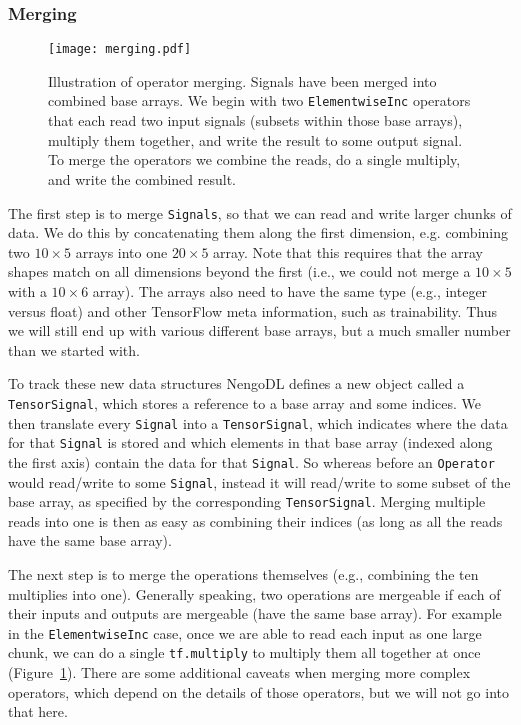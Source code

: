 \documentclass{article}
\begin{document}
\subsubsection{Merging}
\label{sec:merging}

\begin{figure}
\centering
\texttt{[image: merging.pdf]}
\caption{Illustration of operator merging.  Signals have been merged into combined base arrays.  We begin with two \texttt{ElementwiseInc} operators that each read two input signals (subsets within those base arrays), multiply them together, and write the result to some output signal.  To merge the operators we combine the reads, do a single multiply, and write the combined result.}
\label{fig:merging}
\end{figure}

The first step is to merge \texttt{Signals}, so that we can read and write larger chunks of data.  We do this by concatenating them along the first dimension, e.g. combining two $10 \times 5$ arrays into one $20 \times 5$ array.  Note that this requires that the array shapes match on all dimensions beyond the first (i.e., we could not merge a $10 \times 5$ with a $10 \times 6$ array).  The arrays also need to have the same type (e.g., integer versus float) and other TensorFlow meta information, such as trainability.  Thus we will still end up with various different base arrays, but a much smaller number than we started with.

To track these new data structures NengoDL defines a new object called a \texttt{TensorSignal}, which stores a reference to a base array and some indices.  We then translate every \texttt{Signal} into a \texttt{TensorSignal}, which indicates where the data for that \texttt{Signal} is stored and which elements in that base array (indexed along the first axis) contain the data for that \texttt{Signal}.  So whereas before an \texttt{Operator} would read/write to some \texttt{Signal}, instead it will read/write to some subset of the base array, as specified by the corresponding \texttt{TensorSignal}.  Merging multiple reads into one is then as easy as combining their indices (as long as all the reads have the same base array).

The next step is to merge the operations themselves (e.g., combining the ten multiplies into one).  Generally speaking, two operations are mergeable if each of their inputs and outputs are mergeable (have the same base array).  For example in the \texttt{ElementwiseInc} case, once we are able to read each input as one large chunk, we can do a single \texttt{tf.multiply} to multiply them all together at once (Figure~\ref{fig:merging}).  There are some additional caveats when merging more complex operators, which depend on the details of those operators, but we will not go into that here.
\end{document}
